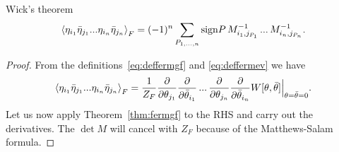 \begin{theorem}{Wick's theorem}{}
$$
  \ev{\eta_{i_1}\bar{\eta}_{j_1}...\eta_{i_n}\bar{\eta}_{j_n}}_F
  =(-1)^n\sum_{P_{1,...,n}}\sign P\,
   M^{-1}_{i_1,j_{P_1}}\,...\,M^{-1}_{i_n,j_{P_n}}.
$$
\begin{proof} From the definitions~\eqref{eq:deffermgf} and
  \eqref{eq:deffermev} we have
  $$
    \ev{\eta_{i_1}\bar{\eta}_{j_1}...\eta_{i_n}\bar{\eta}_{j_n}}_F
    =\frac{1}{Z_F}
    \frac{\partial}{\partial\theta_{j_1}}
    \frac{\partial}{\partial\bar{\theta}_{i_1}}\,...\,
    \frac{\partial}{\partial\theta_{j_n}}
    \frac{\partial}{\partial\bar{\theta}_{i_n}}W[\theta,\bar{\theta}]
    \Big|_{\theta=\bar{\theta}=0}.
  $$
  Let us now apply Theorem~\ref{thm:fermgf} to the RHS and carry
  out the derivatives. The $\det M$ will cancel with $Z_F$ because
  of the Matthews-Salam formula. 
\end{proof}
\end{theorem}

